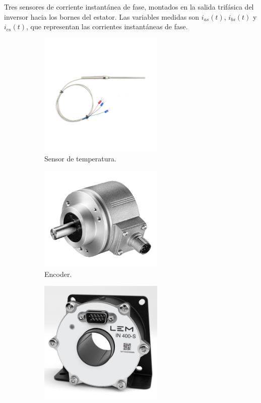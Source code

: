 \documentclass{article}
\begin{document}
  
Tres sensores de corriente instantánea de fase, montados en la salida trifásica del inversor hacia los 
bornes del estator. Las variables medidas son $i_{as}(t)$, $i_{bs}(t)$ y $i_{cs}(t)$, que representan las corrientes 
instantáneas de fase.

\begin{figure}[ht]
    \centering
    \begin{subfigure}[b]{0.3\textwidth}
      \centering
      \includegraphics[width=0.65\textwidth]{Alan6.jpg}
      \caption{Sensor de temperatura.}
    \end{subfigure}
    \begin{subfigure}[b]{0.3\textwidth}
      \centering
      \includegraphics[width=0.65\textwidth]{Alan5.jpg}
      \caption{Encoder.}
    \end{subfigure}
    \begin{subfigure}[b]{0.3\textwidth}
      \centering
      \includegraphics[width=0.65\textwidth]{Alan4.jpg}

\end{subfigure}
\end{figure}
\end{document}
